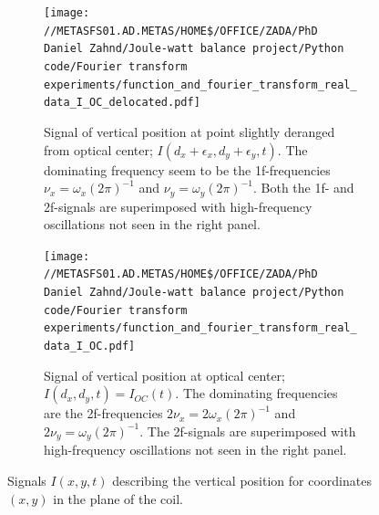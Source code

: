 \documentclass{report}
\numberwithin{tm}{section}
\begin{document}
\begin{figure}[h]
	\centering
	\begin{subfigure}[t]{\textwidth}
		\centering
		\texttt{[image: //METASFS01.AD.METAS/HOME\$/OFFICE/ZADA/PhD Daniel Zahnd/Joule-watt balance project/Python code/Fourier transform experiments/function\_and\_fourier\_transform\_real\_data\_I\_OC\_delocated.pdf]}
		\caption{Signal of vertical position at point slightly deranged from optical center; $I(d_x+\epsilon_x, d_y + \epsilon_y,t)$. The dominating frequency seem to be the 1f-frequencies $\nu_x = \omega_x(2\pi)^{-1}$ and $\nu_y = \omega_y(2\pi)^{-1}$. Both the 1f- and 2f-signals are superimposed with high-frequency oscillations not seen in the right panel.}
		\label{fig:opticalcenterderanged}
	\end{subfigure}
	\begin{subfigure}[t]{\textwidth}
		\centering
		\texttt{[image: //METASFS01.AD.METAS/HOME\$/OFFICE/ZADA/PhD Daniel Zahnd/Joule-watt balance project/Python code/Fourier transform experiments/function\_and\_fourier\_transform\_real\_data\_I\_OC.pdf]}
		\caption{Signal of vertical position at optical center; $I(d_x,d_y,t) = I_{OC}(t)$. The dominating frequencies are the 2f-frequencies $2\nu_x = 2\omega_x(2\pi)^{-1}$ and $2\nu_y = \omega_y(2\pi)^{-1}$. The 2f-signals are superimposed with high-frequency oscillations not seen in the right panel.}
		\label{fig:opticalcenter}
	\end{subfigure}
	\caption{Signals $I(x,y,t)$ describing the vertical position for coordinates $(x,y)$ in the plane of the coil.}
	\label{fig:optimization_principle}
\end{figure}
\end{document}
